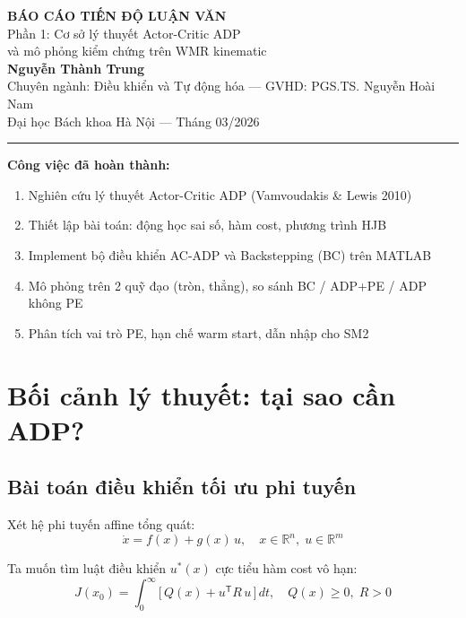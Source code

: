 \documentclass[12pt,a4paper]{article}
\newcommand{\R}{\mathbb{R}}
\newcommand{\T}{\mathsf{T}}
\begin{document}
\begin{center}
    {\Large\bfseries BÁO CÁO TIẾN ĐỘ LUẬN VĂN} \\[6pt]
    {\large Phần 1: Cơ sở lý thuyết Actor-Critic ADP \\
    và mô phỏng kiểm chứng trên WMR kinematic} \\[12pt]
    \textbf{Nguyễn Thành Trung} \\
    Chuyên ngành: Điều khiển và Tự động hóa --- GVHD: PGS.TS. Nguyễn Hoài Nam \\
    Đại học Bách khoa Hà Nội --- Tháng 03/2026
\end{center}

\vspace{4pt}\hrule\vspace{8pt}

\noindent\textbf{Công việc đã hoàn thành:}
\begin{enumerate}[nosep]
    \item Nghiên cứu lý thuyết Actor-Critic ADP (Vamvoudakis \& Lewis 2010)
    \item Thiết lập bài toán: động học sai số, hàm cost, phương trình HJB
    \item Implement bộ điều khiển AC-ADP và Backstepping (BC) trên MATLAB
    \item Mô phỏng trên 2 quỹ đạo (tròn, thẳng), so sánh BC / ADP+PE / ADP không PE
    \item Phân tích vai trò PE, hạn chế warm start, dẫn nhập cho SM2
\end{enumerate}

\section{Bối cảnh lý thuyết: tại sao cần ADP?}

\subsection{Bài toán điều khiển tối ưu phi tuyến}

Xét hệ phi tuyến affine tổng quát:
\begin{equation}\label{eq:nonlinear_sys}
    \dot{x} = f(x) + g(x)\,u, \quad x \in \R^n,\; u \in \R^m
\end{equation}

Ta muốn tìm luật điều khiển $u^*(x)$ cực tiểu hàm cost vô hạn:
\begin{equation}\label{eq:general_cost}
    J(x_0) = \int_0^\infty \big[\, Q(x) + u^\T R\, u \,\big]\, dt, \quad Q(x) \geq 0,\; R > 0
\end{equation}
\end{document}
